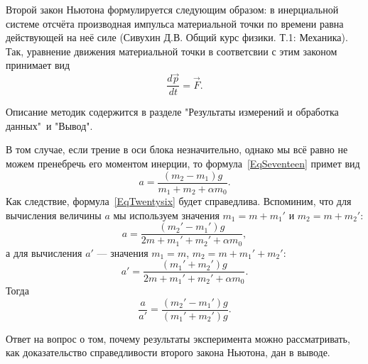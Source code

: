 \begin{Enumerate}
	\item Второй закон Ньютона формулируется следующим образом: в инерциальной системе отсчёта производная импульса материальной точки по времени равна действующей на неё силе (Сивухин Д.В. Общий курс физики. Т.1: Механика). Так, уравнение движения материальной точки в соответсвии с этим законом принимает вид
	\[
	\frac{d\vec p}{dt}=\vec F.
	\]
	
	\item Описание методик содержится в разделе "Результаты измерений и обработка данных"\ и "Вывод"{}.
	
	\item В том случае, если трение в оси блока незначительно, однако мы всё равно не можем пренебречь его моментом инерции, то формула~\eqref{EqSeventeen} примет вид
	\[
	a=\frac{(m_2-m_1)g}{m_1+m_2+\alpha m_0}.
	\]
	Как следствие, формула~\eqref{EqTwentysix} будет справедлива. Вспоминим, что для вычисления величины  $a$ мы используем значения $m_1=m+m_1'$ и $m_2=m+m_2'$:
	\[
	a=\frac{(m_2'-m_1')g}{2m+m_1'+m_2'+\alpha m_0},
	\]
	а для вычисления $a'$ --- значения $m_1=m$, $m_2=m+m_1'+m_2'$:
	\[
	a'=\frac{(m_1'+m_2')g}{2m+m_1'+m_2'+\alpha m_0}.
	\]
	Тогда
	\[
	\frac{a}{a'}=\frac{(m_2'-m_1')g}{(m_1'+m_2')g}.
	\]
	
	\item Ответ на вопрос о том, почему результаты эксперимента можно рассматривать, как доказательство справедливости второго закона Ньютона, дан в выводе.
\end{Enumerate}